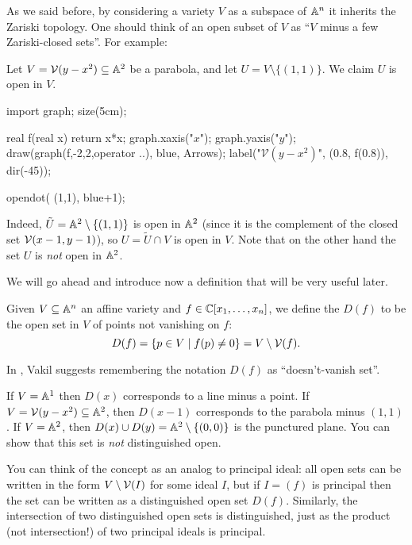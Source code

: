 As we said before, by considering a variety $V$ as a subspace of $\mathbb A^n$
it inherits the Zariski topology.
One should think of an open subset of $V$ as
``$V$ minus a few Zariski-closed sets''.
For example:
\begin{example}
	Let $V = \mathcal V(y-x^2) \subseteq \mathbb A^2$ be a parabola,
	and let $U = V \setminus \{(1,1)\}$. We claim $U$ is open in $V$.
	\begin{center}
		\begin{asy}
		import graph;
		size(5cm);

		real f(real x) { return x*x; }
		graph.xaxis("$x$");
		graph.yaxis("$y$");
		draw(graph(f,-2,2,operator ..), blue, Arrows);
		label("$\mathcal V(y-x^2)$", (0.8, f(0.8)), dir(-45));

		opendot( (1,1), blue+1);
		\end{asy}
	\end{center}
	Indeed, $\tilde U = \mathbb A^2 \setminus \{(1,1)\}$ is open in $\mathbb A^2$
	(since it is the complement of the closed set $\mathcal V(x-1,y-1)$),
	so $U = \tilde U \cap V$ is open in $V$.
	Note that on the other hand the set $U$ is \emph{not} open in $\mathbb A^2$.
\end{example}

We will go ahead and introduce now a definition
that will be very useful later.
\begin{definition}
	Given $V \subseteq \mathbb A^n$ an affine variety and $f \in \mathbb C[x_1, \dots, x_n]$,
	we define the 
	$D(f)$ to be the open set in $V$
	of points not vanishing on $f$:
	\[ D(f) = \left\{ p \in V \mid f(p) \neq 0 \right\} = V \setminus \mathcal V(f). \]
\end{definition}
In \cite{ref:vakil}, Vakil suggests remembering the
notation $D(f)$ as ``doesn't-vanish set''.
\begin{example}
	\listhack
	\begin{enumerate}[(a)]
		\ii If $V = \mathbb A^1$ then $D(x)$ corresponds to a line minus a point.
		\ii If $V = \mathcal V(y-x^2) \subseteq \mathbb A^2$,
		then $D(x-1)$ corresponds to the parabola minus $(1,1)$.
		\ii If $V = \mathbb A^2$, then
		$D(x) \cup D(y) = \mathbb A^2 \setminus \{ (0,0) \}$
		is the punctured plane.
		You can show that this set is \emph{not} distinguished open.
	\end{enumerate}
\end{example}
You can think of the concept as an analog to principal ideal:
all open sets can be written in the form $V \setminus \mathcal V(I)$ for some ideal $I$,
but if $I=(f)$ is principal then the set can be written
as a distinguished open set $D(f)$.
Similarly, the intersection of two distinguished open sets is distinguished,
just as the product (not intersection!) of two principal ideals is principal.

